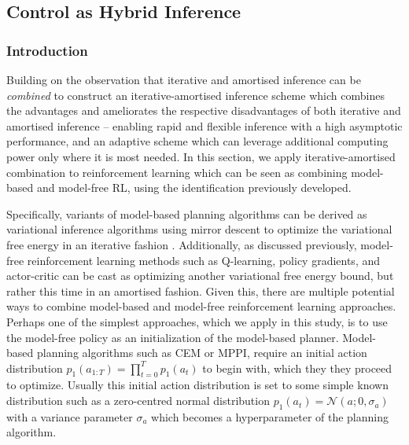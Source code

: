 \subsection{Control as Hybrid Inference}

\subsubsection{Introduction}
Building on the observation that iterative and amortised inference can be \emph{combined} to construct an iterative-amortised inference scheme which combines the advantages and ameliorates the respective disadvantages of both iterative and amortised inference -- enabling rapid and flexible inference with a high asymptotic performance, and an adaptive scheme which can leverage additional computing power only where it is most needed. In this section, we apply iterative-amortised combination to reinforcement learning which can be seen as combining model-based and model-free RL, using the identification previously developed.

Specifically, variants of model-based planning algorithms can be derived as variational inference algorithms using mirror descent to optimize the variational free energy in an iterative fashion \citep{okada_variational_2019}.
Additionally, as discussed previously, model-free reinforcement learning methods such as Q-learning, policy gradients, and actor-critic can be cast as optimizing another variational free energy bound, but rather this time in an amortised fashion. Given this, there are multiple potential ways to combine model-based and model-free reinforcement learning approaches. Perhaps one of the simplest approaches, which we apply in this study, is to use the model-free policy as an initialization of the model-based planner. Model-based planning algorithms such as CEM or MPPI, require an initial action distribution $p_1(a_{1:T}) = \prod_{t=0}^T p_1(a_t)$ to begin with, which they they proceed to optimize. Usually this initial action distribution is set to some simple known distribution such as a zero-centred normal distribution $p_1(a_t) = \mathcal{N}(a; 0, \sigma_a)$ with a variance parameter $\sigma_a$ which becomes a hyperparameter of the planning algorithm.

